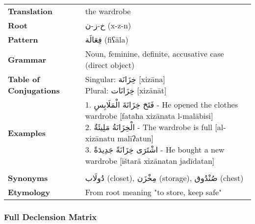 \documentclass[letterpaper,12pt]{article}
\begin{document}
\begin{tabular}{p{3cm}p{10cm}}
\toprule
\textbf{Translation} & the wardrobe \\
\textbf{Root} & \textarabic{خ-ز-ن} (x-z-n) \\
\textbf{Pattern} & \textarabic{فِعَالَة} (fiʕāla) \\
\textbf{Grammar} & Noun, feminine, definite, accusative case (direct object) \\
\textbf{Table of Conjugations} & \makecell[l]{
Singular: \textarabic{خِزَانَة} [xizāna]\\
Plural: \textarabic{خِزَانَات} [xizānāt]
} \\
\textbf{Examples} & \makecell[l]{\parbox{9.5cm}{
1. \textarabic{فَتَحَ خِزَانَةَ الْمَلَابِسِ} - He opened the clothes wardrobe [fataħa xizānata l-malābisi]\\
2. \textarabic{الْخِزَانَةُ مَلِيئَةٌ} - The wardrobe is full [al-xizānatu malīʔatun]\\
3. \textarabic{اشْتَرَى خِزَانَةً جَدِيدَةً} - He bought a new wardrobe [ištarā xizānatan jadīdatan]
}} \\
\midrule \\
\textbf{Synonyms} & \textarabic{دُولَاب} (closet), \textarabic{مِخْزَن} (storage), \textarabic{صُنْدُوق} (chest) \\
\textbf{Etymology} & From root meaning "to store, keep safe" \\
\bottomrule
\end{tabular}

\subsubsection*{Full Declension Matrix}
\end{document}

